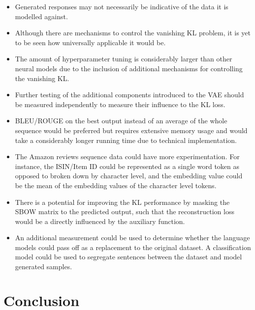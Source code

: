 \documentclass[12pt,twoside]{report}
\begin{document}
\begin{itemize}  
\item Generated responses may not necessarily be indicative of the data it is modelled against.
\item Although there are mechanisms to control the vanishing KL problem, it is yet to be seen how universally applicable it would be.
\item The amount of hyperparameter tuning is considerably larger than other neural models due to the inclusion of additional mechanisms for controlling the vanishing KL.
\item Further testing of the additional components introduced to the VAE should be measured independently to measure their influence to the KL loss. 
\item BLEU/ROUGE on the best output instead of an average of the whole sequence would be preferred but requires extensive memory usage and would take a considerably longer running time due to technical implementation.
\item The Amazon reviews sequence data could have more experimentation. For instance, the ISIN/Item ID could be represented as a single word token as opposed to broken down by character level, and the  embedding value could be the mean of the embedding values of the character level tokens.
\item There is a potential for improving the KL performance by masking the SBOW matrix to the predicted output, such that the reconstruction loss would be a directly influenced by the auxiliary function.
\item An additional measurement could be used to determine whether the language models could pass off as a replacement to the original dataset. A classification model could be used to segregate sentences between the dataset and model generated samples. 
\end{itemize}


\chapter{Conclusion}
\end{document}
